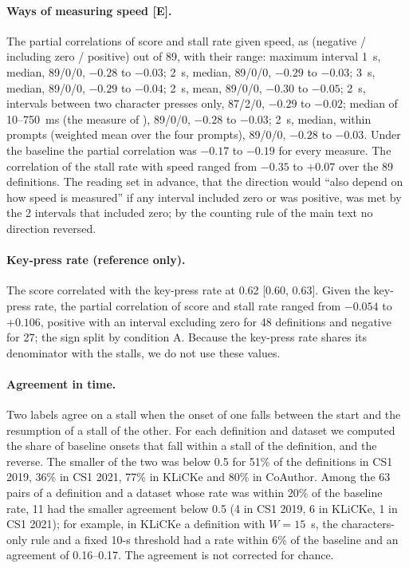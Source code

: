 \paragraph{Ways of measuring speed [E].} The partial correlations of score and stall rate given speed, as (negative /
including zero / positive) out of 89, with their range: maximum interval 1~s, median, 89/0/0, $-0.28$ to $-0.03$;
2~s, median, 89/0/0, $-0.29$ to $-0.03$; 3~s, median, 89/0/0, $-0.29$ to $-0.04$; 2~s, mean, 89/0/0, $-0.30$ to $-0.05$;
2~s, intervals between two character presses only, 87/2/0, $-0.29$ to $-0.02$; median of 10--750~ms (the measure of
), 89/0/0, $-0.28$ to $-0.03$; 2~s, median, within prompts (weighted mean over the four
prompts), 89/0/0, $-0.28$ to $-0.03$. Under the baseline the partial correlation was $-0.17$ to $-0.19$ for every
measure. The correlation of the stall rate with speed ranged from $-0.35$ to $+0.07$ over the 89 definitions. The
reading set in advance, that the direction would ``also depend on how speed is measured'' if any interval included zero
or was positive, was met by the 2 intervals that included zero; by the counting rule of the main text no direction
reversed.

\paragraph{Key-press rate (reference only).} The score correlated with the key-press rate at 0.62 [0.60, 0.63]. Given
the key-press rate, the partial correlation of score and stall rate ranged from $-0.054$ to $+0.106$, positive with an
interval excluding zero for 48 definitions and negative for 27; the sign split by condition A. Because the key-press
rate shares its denominator with the stalls, we do not use these values.

\paragraph{Agreement in time.} Two labels agree on a stall when the onset of one falls between the start and the
resumption of a stall of the other. For each definition and dataset we computed the share of baseline onsets that fall
within a stall of the definition, and the reverse. The smaller of the two was below 0.5 for 51\% of the definitions in CS1 2019, 36\%
in CS1 2021, 77\% in KLiCKe and 80\% in CoAuthor. Among the 63 pairs of a definition and a dataset whose rate was within
20\% of the baseline rate, 11 had the smaller agreement below 0.5 (4 in CS1 2019, 6 in KLiCKe, 1 in CS1 2021); for
example, in KLiCKe a definition with $W = 15$~s, the characters-only rule and a fixed 10-s threshold had a rate within
6\% of the baseline and an agreement of 0.16--0.17. The agreement is not corrected for chance.

